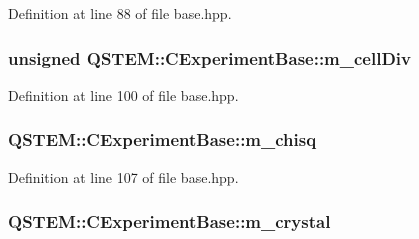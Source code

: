 Definition at line 88 of file base.\-hpp.

\hypertarget{class_q_s_t_e_m_1_1_c_experiment_base_a558d18e58e3b66bc50e5c1ca8de0be2b}{
\subsubsection[{m\-\_\-cell\-Div}]{\setlength{\rightskip}{0pt plus 5cm}unsigned Q\-S\-T\-E\-M\-::\-C\-Experiment\-Base\-::m\-\_\-cell\-Div\hspace{0.3cm}{\ttfamily [protected]}}}\label{class_q_s_t_e_m_1_1_c_experiment_base_a558d18e58e3b66bc50e5c1ca8de0be2b}


Definition at line 100 of file base.\-hpp.

\hypertarget{class_q_s_t_e_m_1_1_c_experiment_base_acf948f03593bc01eb970074215d4fabb}{
\subsubsection[{m\-\_\-chisq}]{ Q\-S\-T\-E\-M\-::\-C\-Experiment\-Base\-::m\-\_\-chisq\hspace{0.3cm}{\ttfamily [protected]}}}\label{class_q_s_t_e_m_1_1_c_experiment_base_acf948f03593bc01eb970074215d4fabb}


Definition at line 107 of file base.\-hpp.

\hypertarget{class_q_s_t_e_m_1_1_c_experiment_base_ab062414fe8f7aef9aad2d070e9130bac}{
\subsubsection[{m\-\_\-crystal}]{ Q\-S\-T\-E\-M\-::\-C\-Experiment\-Base\-::m\-\_\-crystal\hspace{0.3cm}{\ttfamily [protected]}}}\label{class_q_s_t_e_m_1_1_c_experiment_base_ab062414fe8f7aef9aad2d070e9130bac}


